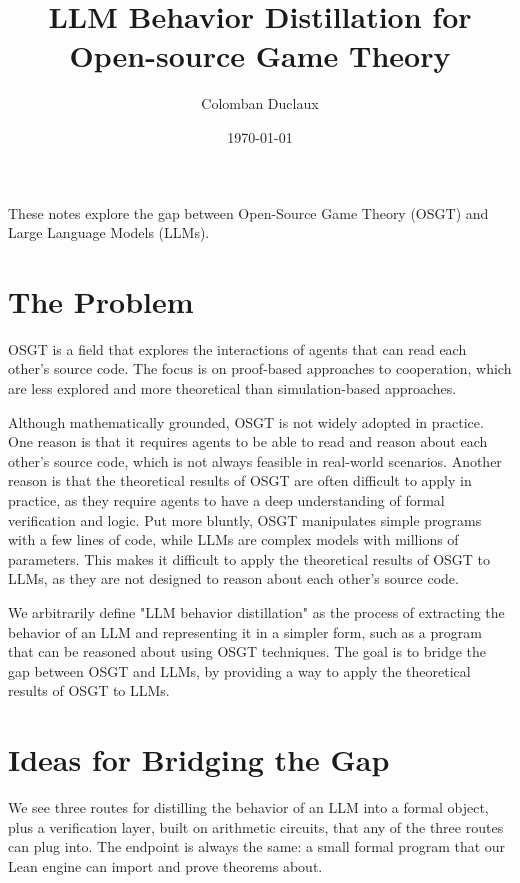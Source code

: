 \documentclass{article}
\title{LLM Behavior Distillation for Open-source Game Theory}
\author{Colomban Duclaux}
\date{\today}
\begin{document}
\maketitle

These notes explore the gap between Open-Source Game Theory (OSGT) and Large Language Models (LLMs).

\section{The Problem}
OSGT is a field that explores the interactions of agents that can read each other's source code. The focus is on proof-based approaches to cooperation, which are less explored and more theoretical than simulation-based approaches.

Although mathematically grounded, OSGT is not widely adopted in practice. One reason is that it requires agents to be able to read and reason about each other's source code, which is not always feasible in real-world scenarios. Another reason is that the theoretical results of OSGT are often difficult to apply in practice, as they require agents to have a deep understanding of formal verification and logic. Put more bluntly, OSGT manipulates simple programs with a few lines of code, while LLMs are complex models with millions of parameters. This makes it difficult to apply the theoretical results of OSGT to LLMs, as they are not designed to reason about each other's source code.

We arbitrarily define "LLM behavior distillation" as the process of extracting the behavior of an LLM and representing it in a simpler form, such as a program that can be reasoned about using OSGT techniques. The goal is to bridge the gap between OSGT and LLMs, by providing a way to apply the theoretical results of OSGT to LLMs.

\section{Ideas for Bridging the Gap}
We see three routes for distilling the behavior of an LLM into a formal object, plus a verification layer, built on arithmetic circuits, that any of the three routes can plug into. The endpoint is always the same: a small formal program that our Lean engine can import and prove theorems about.
\end{document}
